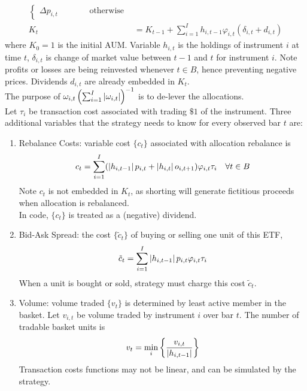 \begin{method}
\begin{align}
\begin{cases}
\Delta p_{i,t} \ \ \ \ \ \ \ \ \ \ \ \ \ \ \ \ \ \text{otherwise}
\end{cases} \nonumber \\
K_t &= K_{t-1} + \sum\limits_{i=1}^I h_{i, t-1} \varphi_{i,t} (\delta_{i,t} + d_{i,t}) \nonumber
\end{align}
where $K_0 = 1$ is the initial AUM. Variable $h_{i,t}$ is the holdings of instrument $i$ at time $t$, $\delta_{i,t}$ is change of market value between $t-1$ and $t$ for instrument $i$. Note profits or losses are being reinvested whenever $t \in B$, hence preventing negative prices. Dividends $d_{i,t}$ are already embedded in $K_t$.\\
The purpose of $\omega_{i,t} \left( \sum_{i=1}^I \left\lvert\omega_{i,t}\right\rvert \right)^{-1}$ is to de-lever the allocations.\\
Let $\tau_i$ be transaction cost associated with trading $\$1$ of the instrument. Three additional variables that the strategy needs to know for every observed bar $t$ are:
\begin{enumerate}[label=\roman*.]
\setlength{\itemsep}{0pt}
\item Rebalance Costs: variable cost $\{c_t\}$ associated with allocation rebalance is
\begin{equation}
c_t = \sum\limits_{i=1}^I (\left\lvert h_{i, t-1}\right\rvert p_{i,t} + \left\lvert h_{i,t}\right\rvert o_{i, t+1}) \varphi_{i,t} \tau_{i} \ \ \ \forall t \in B \nonumber
\end{equation}
Note $c_t$ is not embedded in $K_t$, as shorting will generate fictitious proceeds when allocation is rebalanced.\\
In code, $\{c_t\}$ is treated as a (negative) dividend.
\item Bid-Ask Spread: the cost $\{ \tilde{c}_t \}$ of buying or selling one unit of this ETF,
\begin{equation}
\tilde{c}_t = \sum\limits_{i=1}^I \left\lvert h_{i, t-1}\right\rvert p_{i, t} \varphi_{i,t} \tau_i \nonumber
\end{equation}
When a unit is bought or sold, strategy must charge this cost $\tilde{c}_t$.
\item Volume: volume traded $\{v_t \}$ is determined by least active member in the basket. Let $v_{i,t}$ be volume traded by instrument $i$ over bar $t$. The number of tradable basket units is
\begin{equation}
v_t = \min_i \left\{ \frac{v_{i,t}}{\left\lvert h_{i, t-1}\right\rvert} \right\} \nonumber
\end{equation}
Transaction costs functions may not be linear, and can be simulated by the strategy.
\end{enumerate}
\end{method}